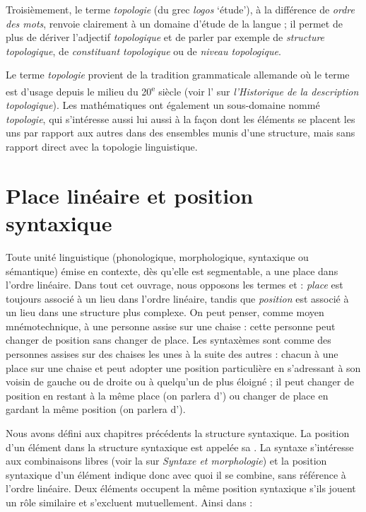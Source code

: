 Troisièmement, le terme \textit{topologie} (du grec \textit{logos} ‘étude’), à la différence de \textit{ordre des mots}, renvoie clairement à un domaine d’étude de la langue ; il permet de plus de dériver l’adjectif \textit{topologique} et de parler par exemple de \textit{structure topologique}, de \textit{constituant topologique} ou de \textit{niveau topologique}.

Le terme \textit{topologie} provient de la tradition grammaticale allemande où le terme est d’usage depuis le milieu du 20\textsuperscript{e} siècle (voir l' sur \textit{l’Historique de la description topologique}). Les mathématiques ont également un sous-domaine nommé \textit{topologie}, qui s'intéresse aussi lui aussi à la façon dont les éléments se placent les uns par rapport aux autres dans des ensembles munis d’une structure, mais sans rapport direct avec la topologie linguistique.

\section{Place linéaire et position syntaxique}\label{sec:3.5.3}

Toute unité linguistique (phonologique, morphologique, syntaxique ou sémantique) émise en contexte, dès qu’elle est segmentable, a une place dans l’ordre linéaire. Dans tout cet ouvrage, nous opposons les termes  et  : \textit{place} est toujours associé à un lieu dans l’ordre linéaire, tandis que \textit{position} est associé à un lieu dans une structure plus complexe. On peut penser, comme moyen mnémotechnique, à une personne assise sur une chaise : cette personne peut changer de position sans changer de place. Les syntaxèmes sont comme des personnes assises sur des chaises les unes à la suite des autres : chacun à une place sur une chaise et peut adopter une position particulière en s'adressant à son voisin de gauche ou de droite ou à quelqu'un de plus éloigné ; il peut changer de position en restant à la même place (on parlera d’) ou changer de place en gardant la même position (on parlera d’).

Nous avons défini aux chapitres précédents la structure syntaxique. La position d’un élément dans la structure syntaxique est appelée sa . La syntaxe s’intéresse aux combinaisons libres (voir la  sur \textit{Syntaxe et morphologie}) et la position syntaxique d’un élément indique donc avec quoi il se combine, sans référence à l’ordre linéaire. Deux éléments occupent la même position syntaxique s’ils jouent un rôle similaire et s’excluent mutuellement. Ainsi dans :

